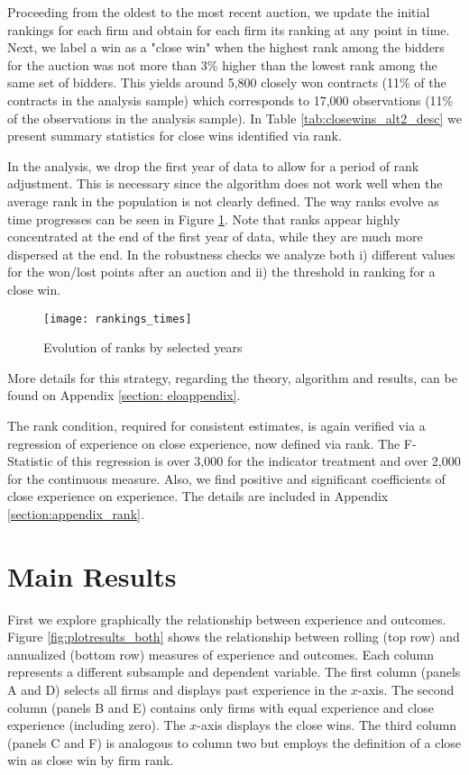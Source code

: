 Proceeding from the oldest to the most recent auction, we update the initial rankings for each firm and obtain for each firm its ranking at any point in time. Next, we label a win as a "close win" when the highest rank among the bidders for the auction was not more than 3\% higher than the lowest rank among the same set of bidders. This yields around  5,800 closely won contracts (11\% of the contracts in the analysis sample) which corresponds to 17,000 observations (11\% of the observations in the analysis sample). In Table \ref{tab:closewins_alt2_desc} we present summary statistics for close wins identified via rank.



In the analysis, we drop the first year of data to allow for a period of rank adjustment. This is necessary since the algorithm does not work well when the average rank in the population is not clearly defined. The way ranks evolve as time progresses  can be seen in Figure \ref{fig:rankings_times}. Note that ranks appear highly concentrated at the end of the first year of data, while they are much more dispersed at the end. In the robustness checks we analyze both i) different values for the won/lost points after an auction and ii) the threshold in ranking for a close win.

\begin{figure}
  \texttt{[image: rankings\_times]}
  \caption{Evolution of ranks by selected years}
  \label{fig:rankings_times}
  \vskip 0.5mm
  { \footnotesize \underline{ } \par}
\end{figure}

More details for this strategy, regarding the theory, algorithm and results, can be found on Appendix \ref{section: eloappendix}.

The rank condition, required for consistent estimates, is again verified via a regression of experience on close experience, now defined via rank. The F-Statistic of this regression is over 3,000 for the indicator treatment and over 2,000 for the continuous measure. Also, we find positive and significant coefficients of close experience on experience. The details are included in Appendix \ref{section:appendix_rank}.

\section{Main Results}
\label{section:main_results}
First we explore graphically the relationship between experience and outcomes. Figure \ref{fig:plotresults_both} shows the relationship between rolling (top row) and annualized (bottom row) measures of experience and outcomes.  Each column represents a different subsample and dependent variable. The first column (panels A and D) selects all firms and displays past experience in the $x$-axis. The second column (panels B and E) contains only firms with equal experience and close experience (including zero). The $x$-axis displays the close wins. The third column (panels C and F) is analogous to column two but employs the definition of a close win as close win by firm rank.

